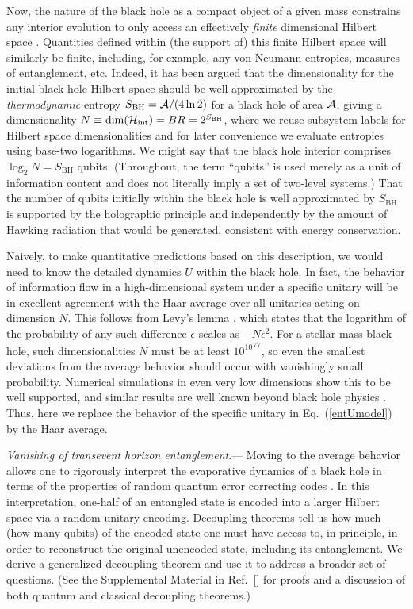 \documentclass[aps,showpacs,prl,12pt]{revtex4}
\begin{document}
Now, the nature of the black hole as a compact object of a given mass 
constrains any interior evolution to only access an effectively {\it 
finite\/} dimensional Hilbert space \cite{B10}. Quantities defined within
(the support of) this finite Hilbert space will similarly be finite,
including, for example, any von Neumann entropies, measures of
entanglement, etc. Indeed, it has been argued \cite{Susskind93}
that the dimensionality for the initial black hole Hilbert space should
be well approximated by the {\it thermodynamic\/} entropy
$S_{\text{BH}}={\cal A}/(4\ln 2)$ for a black hole of area ${\cal A}$,
giving a dimensionality
$N\equiv\text{dim}({\cal H}_\text{int})= BR= 2^{S_{\text{BH}}}$,
where we reuse subsystem labels for Hilbert space dimensionalities
and for later convenience we evaluate entropies using base-two logarithms.
We might say that the black hole interior comprises
$\log_2 N=S_{\text{BH}}$ qubits. (Throughout, the term ``qubits'' is used
merely as a unit of information content and does not literally imply 
a set of two-level systems.) That the number of qubits
initially within the black hole is well approximated by $S_{\text{BH}}$
is supported by the holographic principle \cite{tHooft93} and 
independently by the amount of Hawking radiation that would be
generated, consistent with energy conservation. 

Naively, to make quantitative predictions based on this description,
we would need to know the detailed dynamics $U$ within the black hole.
In fact, the behavior of information flow in a high-dimensional system 
under a specific unitary will be in excellent agreement with the Haar 
average over all unitaries acting on dimension $N$. This follows from
Levy's lemma \cite{Levy}, which states that the logarithm of the
probability of any such difference $\epsilon$ scales as $-N \epsilon^2$. 
For a stellar mass black hole, such dimensionalities $N$ must be at least 
${10^{10}}^{77}$, so even the smallest deviations from the average behavior 
should occur with vanishingly small probability. Numerical simulations
in even very low dimensions show this to be well supported, and similar
results are well known beyond black hole physics \cite{Mehta}. Thus, here
we replace the behavior of the specific unitary in Eq.~(\ref{entUmodel}) 
by the Haar average.

{\it Vanishing of transevent horizon entanglement}.---%
Moving to the average behavior allows one to
rigorously interpret the evaporative dynamics of a black hole in terms
of the properties of random quantum error correcting codes \cite{Hayden07}.
In this interpretation, one-half of an entangled state is encoded
into a larger Hilbert space via a random unitary encoding. Decoupling
theorems \cite{Abey06} tell us how much (how many qubits) of the encoded
state one must have access to, in principle, in order to reconstruct the
original unencoded state, including its entanglement. We derive a
generalized decoupling theorem and use it to address a broader set of
questions. (See the Supplemental Material in Ref.~[] for
proofs and a discussion of both quantum and classical decoupling
theorems.)
\end{document}

